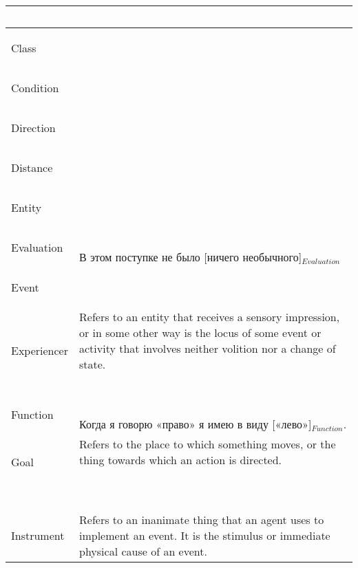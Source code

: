 \documentclass[a4paper,11pt, onecolumn,twoside]{article}
\begin{document}
\begin{longtable}{ p{}  p{} }
        & ~ \\
\midrule
 \multirow{2}{*}{Class} & ~ \\ 
        & ~ \\
\midrule
 \multirow{2}{*}{Condition} & ~ \\ 
        & ~ \\
\midrule
 \multirow{2}{*}{Direction} & ~ \\ 
        & ~ \\
\midrule
 \multirow{2}{*}{Distance} & ~ \\ 
        & ~ \\
\midrule
 \multirow{2}{*}{Entity} & ~ \\ 
        & ~ \\
\midrule
 \multirow{2}{*}{Evaluation} & ~ \\  
        & В этом поступке не было [ничего необычного]$_{Evaluation}$ \\
\midrule
 \multirow{2}{*}{Event} & ~ \\ 
        & ~ \\
\midrule
 \multirow{2}{*}{Experiencer} & Refers to an entity that receives a sensory impression, or in some other way is the locus of some event or activity that involves neither volition nor a change of state. \\ 
        & ~ \\
\midrule
 \multirow{2}{*}{Function} & ~ \\ 
        & Когда я говорю «право» я имею в виду [«лево»]$_{Function}$. \\
\midrule
 \multirow{2}{*}{Goal} & Refers to the place to which something moves, or the thing towards which an action is directed. \\ 
\midrule
 \multirow{2}{*}{Goer} & ~ \\ 
        & ~ \\
\midrule
 \multirow{2}{*}{Instrument} & Refers to an inanimate thing that an agent uses to implement an event. It is the stimulus or immediate physical cause of an event. \\ 

\end{longtable}
\end{document}
